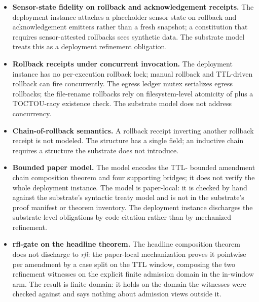 \begin{itemize}
    path, the tool-preflight admission hook, and the package-manager
    runtime guard. The substrate model treats sensor state as an
    audited input; the deployment instance's input fidelity on the
    Endpoint Security path is below the substrate model's assumption.
  \item \textbf{Sensor-state fidelity on rollback and acknowledgement
    receipts.} The deployment instance attaches a placeholder sensor
    state on rollback and acknowledgement emitters rather than a
    fresh snapshot; a constitution that requires sensor-attested
    rollbacks sees synthetic data. The substrate model treats this
    as a deployment refinement obligation.
  \item \textbf{Rollback receipts under concurrent invocation.} The
    deployment instance has no per-execution rollback lock; manual
    rollback and TTL-driven rollback can fire concurrently. The
    egress ledger mutex serializes egress rollbacks; the file-rename
    rollbacks rely on filesystem-level atomicity of
     plus a TOCTOU-racy existence check. The
    substrate model does not address concurrency.
  \item \textbf{Chain-of-rollback semantics.} A rollback receipt
    inverting another rollback receipt is not modeled. The
     structure has a single
     field; an inductive chain requires a
    structure the substrate does not introduce.
  \item \textbf{Bounded paper model.} The model encodes the TTL-
    bounded amendment chain composition theorem and four supporting
    bridges; it does not verify the whole deployment instance. The
    model is paper-local: it is checked by hand against the substrate's
    syntactic treaty model and is not in the substrate's proof manifest
    or theorem inventory. The deployment instance discharges the
    substrate-level obligations by code citation rather than by
    mechanized refinement.
  \item \textbf{rfl-gate on the headline theorem.} The headline
    composition theorem 
    does not discharge to \emph{rfl}: the paper-local mechanization
    proves it pointwise per amendment by a case split on the TTL window,
    composing the two refinement witnesses on the explicit finite
    admission domain in the in-window arm. The result is finite-domain:
    it holds on the domain the witnesses were checked against and says
    nothing about admission views outside it.

\end{itemize}
